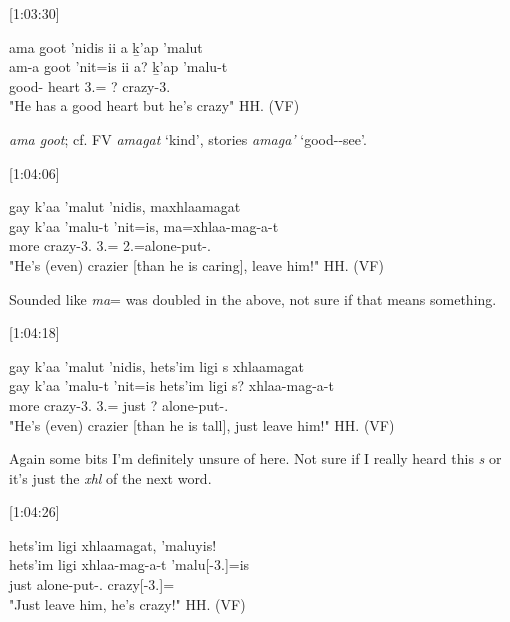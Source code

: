 [1:03:30]
\begin{exe}
    \ex \glll
    ama g̱oot ’nidis ii a ḵ’ap ’malut \\
    am-a g̱oot ’nit=is ii a? ḵ’ap ’malu-t \\
    good-\Attr{} heart 3.\Iii=\Qudd{} \Ccnj{} \Prep? \Verum{} crazy-3.\Ii{} \\
    \glt "He has a good heart but he's crazy" \hfill HH.\ElicitationDate{} (VF)
\end{exe}

\textit{ama g̱oot}; cf. FV \textit{amagat} `kind', stories \textit{amaga'} `good-\Attr-see'.

[1:04:06]
\begin{exe}
    \ex \glll
    g̱ay k’aa ’malut ’nidis,  maxhlaamag̱at \\
    g̱ay k’aa ’malu-t ’nit=is,  ma=xhlaa-mag̱-a-t \\
    \Cntr{} more crazy-3.\Ii{} 3.\Iii=\Qudd{} 2.\I=alone-put-.\Ii \\
    \glt "He's (even) crazier [than he is caring], leave him!" \hfill HH.\ElicitationDate{} (VF)
\end{exe}

Sounded like \textit{ma}= was doubled in the above, not sure if that means something. 

[1:04:18]
\begin{exe}
    \ex \glll
    g̱ay k’aa ’malut ’nidis,  hets'im ligi s xhlaamag̱at \\
    g̱ay k’aa ’malu-t ’nit=is  hets'im ligi s? xhlaa-mag̱-a-t \\
    \Cntr{} more crazy-3.\Ii{} 3.\Iii=\Qudd{} just \Dwid{} ? alone-put-.\Ii \\
    \glt "He's (even) crazier [than he is tall], just leave him!" \hfill HH.\ElicitationDate{} (VF)
\end{exe}

Again some bits I'm definitely unsure of here. Not sure if I really heard this \textit{s} or it's just the \textit{xhl} of the next word.

[1:04:26]
\begin{exe}
    \ex \glll
    hets'im ligi xhlaamag̱at, ’maluyis! \\
    hets'im ligi xhlaa-mag̱-a-t ’malu[-3.\Ii]=is \\
    just \Dwid{} alone-put-.\Ii{} crazy[-3.\Ii]=\Qudd \\
    \glt "Just leave him, he's crazy!" \hfill HH.\ElicitationDate{} (VF)
\end{exe}

